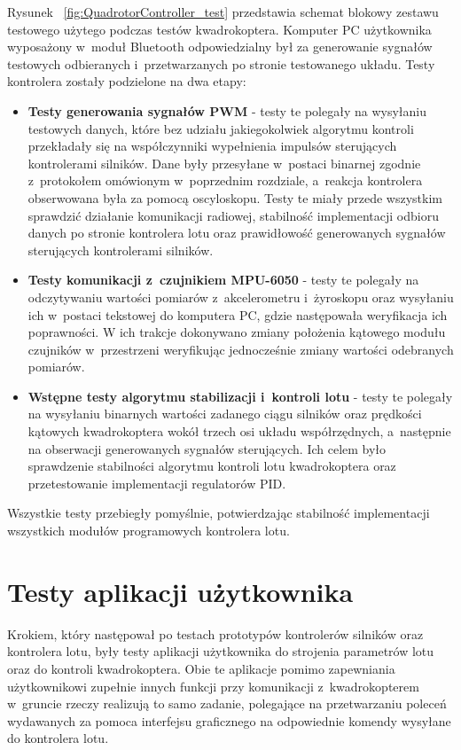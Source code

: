 \documentclass[11pt, twoside]{Thesis} %
\begin{document}
Rysunek ~\ref{fig:QuadrotorController_test} przedstawia schemat blokowy zestawu testowego użytego podczas testów kwadrokoptera. Komputer PC użytkownika wyposażony w~moduł Bluetooth odpowiedzialny był za generowanie sygnałów testowych odbieranych i~przetwarzanych po stronie testowanego układu. Testy kontrolera zostały podzielone na dwa etapy:
\begin{itemize}
	\item \textbf{Testy generowania sygnałów PWM} - testy te polegały na wysyłaniu testowych danych, które bez udziału jakiegokolwiek algorytmu kontroli przekładały się na współczynniki wypełnienia impulsów sterujących kontrolerami silników. Dane były przesyłane w~postaci binarnej zgodnie z~protokołem omówionym w~poprzednim rozdziale, a~reakcja kontrolera obserwowana była za pomocą oscyloskopu. Testy te miały przede wszystkim sprawdzić działanie komunikacji radiowej, stabilność implementacji odbioru danych po stronie kontrolera lotu oraz prawidłowość generowanych sygnałów sterujących kontrolerami silników.
	\item \textbf{Testy komunikacji z~czujnikiem MPU-6050} - testy te polegały na odczytywaniu wartości pomiarów z~akcelerometru i~żyroskopu oraz wysyłaniu ich w~postaci tekstowej do komputera PC, gdzie następowała weryfikacja ich poprawności. W ich trakcje dokonywano zmiany położenia kątowego modułu czujników w~przestrzeni weryfikując jednocześnie zmiany wartości odebranych pomiarów.  
	\item \textbf{Wstępne testy algorytmu stabilizacji i~kontroli lotu} - testy te polegały na wysyłaniu binarnych wartości zadanego ciągu silników oraz prędkości kątowych kwadrokoptera wokół trzech osi układu współrzędnych, a~następnie na obserwacji generowanych sygnałów sterujących. Ich celem było sprawdzenie stabilności algorytmu kontroli lotu kwadrokoptera oraz przetestowanie implementacji regulatorów PID.   
\end{itemize}

Wszystkie testy przebiegły pomyślnie, potwierdzając stabilność implementacji wszystkich modułów programowych kontrolera lotu.

\section{Testy aplikacji użytkownika}

Krokiem, który następował po testach prototypów kontrolerów silników oraz kontrolera lotu, były testy aplikacji użytkownika do strojenia parametrów lotu oraz do kontroli kwadrokoptera. Obie te aplikacje pomimo zapewniania użytkownikowi zupełnie innych funkcji przy komunikacji z~kwadrokopterem w~gruncie rzeczy realizują to samo zadanie, polegające na przetwarzaniu poleceń wydawanych za pomoca interfejsu graficznego na odpowiednie komendy wysyłane do kontrolera lotu. 
\end{document}
